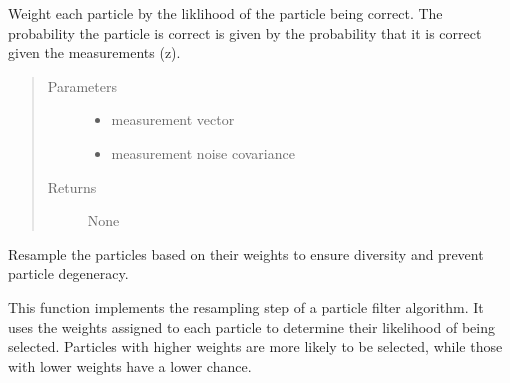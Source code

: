 \documentclass[letterpaper,10pt,english]{sphinxmanual}
\begin{document}
\begin{fulllineitems}
\begin{fulllineitems}
\end{fulllineitems}


\begin{fulllineitems}
\label{\detokenize{particle_filter:PFMBLocalization.PFMBL.Weight}}
\sphinxAtStartPar
Weight each particle by the liklihood of the particle being correct.
The probability the particle is correct is given by the probability that it is correct given the measurements (z).
\begin{quote}\begin{description}
\item[{Parameters}] \leavevmode\begin{itemize}
\item {} 
\sphinxAtStartPar
{} \textendash{} measurement vector

\item {} 
\sphinxAtStartPar
{} \textendash{} measurement noise covariance

\end{itemize}

\item[{Returns}] \leavevmode
\sphinxAtStartPar
None

\end{description}\end{quote}

\end{fulllineitems}


\begin{fulllineitems}
\label{\detokenize{particle_filter:PFMBLocalization.PFMBL.Resample}}
\sphinxAtStartPar
Resample the particles based on their weights to ensure diversity and prevent particle degeneracy.

\sphinxAtStartPar
This function implements the resampling step of a particle filter algorithm. It uses the weights
assigned to each particle to determine their likelihood of being selected. Particles with higher weights
are more likely to be selected, while those with lower weights have a lower chance.


\end{fulllineitems}
\end{fulllineitems}
\end{document}
